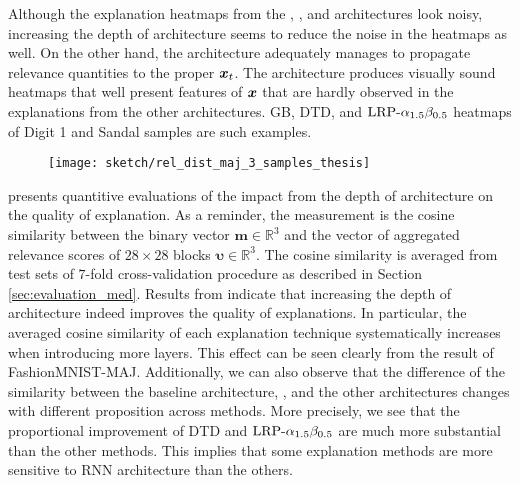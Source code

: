 Although the explanation heatmaps from the , , and  architectures look noisy, increasing the depth of architecture seems to reduce the noise in the heatmaps as well.   On the other hand, the  architecture adequately manages to propagate relevance quantities to the proper $\boldsymbol{x}_t$. The architecture produces visually sound heatmaps that well present features of $\boldsymbol{x}$ that are hardly observed in the explanations from the other architectures.  GB, DTD, and $\text{LRP-}\alpha_{1.5}\beta_{0.5}$ heatmaps of Digit 1 and Sandal samples are such examples.

 \begin{figure}[!hbt]
\centering
\texttt{[image: sketch/rel\_dist\_maj\_3\_samples\_thesis]}



\label{fig:rel_dist_maj_3_samples_thesis}
\end{figure}

\addfigure{\ref{fig:rel_dist_maj_3_samples_thesis}} presents quantitive evaluations of the impact from the depth of architecture on the quality of explanation. As a reminder, the measurement is the cosine similarity between the binary vector $\boldsymbol{m} \in \mathbb{R}^3$ and the vector of aggregated relevance scores of $28\times28$ blocks $\boldsymbol{\upsilon} \in \mathbb{R}^3$. The cosine similarity is averaged from test sets of $7$-fold cross-validation procedure as described in Section \ref{sec:evaluation_med}. Results from \addfigure{\ref{fig:rel_dist_maj_3_samples_thesis}} indicate that increasing the depth of architecture indeed improves the quality of explanations. In particular, the averaged cosine similarity of each explanation technique systematically increases when introducing  more layers. This effect can be seen clearly from the result of FashionMNIST-MAJ. Additionally, we can also observe that the difference of the similarity between the baseline architecture, , and the other  architectures changes with different proposition across methods. More precisely, we see that the proportional improvement of  DTD and $\text{LRP-}\alpha_{1.5}\beta_{0.5}$ are much more substantial than the other methods. This implies that some explanation methods are more sensitive to RNN architecture than the others.



